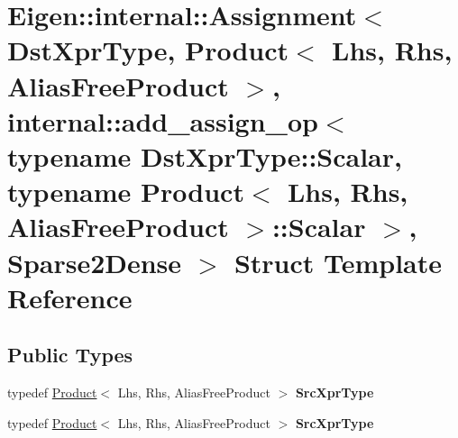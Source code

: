 \hypertarget{struct_eigen_1_1internal_1_1_assignment_3_01_dst_xpr_type_00_01_product_3_01_lhs_00_01_rhs_00_01829d7a1a901a0be4e54bdeda694d8781}{}\section{Eigen\+:\+:internal\+:\+:Assignment$<$ Dst\+Xpr\+Type, Product$<$ Lhs, Rhs, Alias\+Free\+Product $>$, internal\+:\+:add\+\_\+assign\+\_\+op$<$ typename Dst\+Xpr\+Type\+:\+:Scalar, typename Product$<$ Lhs, Rhs, Alias\+Free\+Product $>$\+:\+:Scalar $>$, Sparse2\+Dense $>$ Struct Template Reference}
\label{struct_eigen_1_1internal_1_1_assignment_3_01_dst_xpr_type_00_01_product_3_01_lhs_00_01_rhs_00_01829d7a1a901a0be4e54bdeda694d8781}
\subsection*{Public Types}
\begin{DoxyCompactItemize}
\item 
\mbox{\label{struct_eigen_1_1internal_1_1_assignment_3_01_dst_xpr_type_00_01_product_3_01_lhs_00_01_rhs_00_01829d7a1a901a0be4e54bdeda694d8781_a394636ac491ce75403314e37e12bddcf}} 
typedef \hyperlink{group___core___module_class_eigen_1_1_product}{Product}$<$ Lhs, Rhs, Alias\+Free\+Product $>$ {\bfseries Src\+Xpr\+Type}
\item 
\mbox{\label{struct_eigen_1_1internal_1_1_assignment_3_01_dst_xpr_type_00_01_product_3_01_lhs_00_01_rhs_00_01829d7a1a901a0be4e54bdeda694d8781_a394636ac491ce75403314e37e12bddcf}} 
typedef \hyperlink{group___core___module_class_eigen_1_1_product}{Product}$<$ Lhs, Rhs, Alias\+Free\+Product $>$ {\bfseries Src\+Xpr\+Type}
\end{DoxyCompactItemize}
